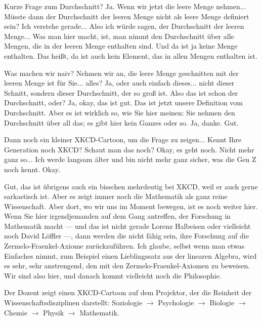 \begin{spoken-clean}[00:39:35 - 00:40:53]
Kurze Frage zum Durchschnitt? Ja. Wenn wir jetzt die leere Menge nehmen... Müsste dann der Durchschnitt der leeren Menge nicht als leere Menge definiert sein? Ich verstehe gerade... Also ich würde sagen, der Durchschnitt der leeren Menge... Was man hier macht, ist, man nimmt den Durchschnitt über alle Mengen, die in der leeren Menge enthalten sind. Und da ist ja keine Menge enthalten. Das heißt, da ist auch kein Element, das in allen Mengen enthalten ist.

Was machen wir naiv? Nehmen wir an, die leere Menge geschnitten mit der leeren Menge ist für Sie... alles? Ja, oder auch einfach dieses... nicht dieser Schnitt, sondern dieser Durchschnitt, der so groß ist. Also das ist schon der Durchschnitt, oder? Ja, okay, das ist gut. Das ist jetzt unsere Definition vom Durchschnitt. Aber es ist wirklich so, wie Sie hier meinen: Sie nehmen den Durchschnitt über all das; es gibt hier kein Ganzes oder so. Ja, danke. Gut.
\end{spoken-clean}

\begin{spoken-clean}[00:40:53 - 00:41:07]
Dann noch ein kleiner XKCD-Cartoon, um die Frage zu zeigen... Kennt Ihre Generation noch XKCD? Schaut man das noch? Okay, es geht noch. Nicht mehr ganz so... Ich werde langsam älter und bin nicht mehr ganz sicher, was die Gen Z noch kennt. Okay.

Gut, das ist übrigens auch ein bisschen mehrdeutig bei XKCD, weil er auch gerne sarkastisch ist. Aber es zeigt immer noch die Mathematik als ganz reine Wissenschaft. Aber dort, wo wir uns im Moment bewegen, ist es noch weiter hier. Wenn Sie hier irgendjemanden auf dem Gang antreffen, der Forschung in Mathematik macht --- und das ist nicht gerade Lorenz Halbeisen oder vielleicht noch David Löffler ---, dann werden die nicht fähig sein, ihre Forschung auf die Zermelo-Fraenkel-Axiome zurückzuführen. Ich glaube, selbst wenn man etwas Einfaches nimmt, zum Beispiel einen Lieblingssatz aus der linearen Algebra, wird es sehr, sehr anstrengend, den mit den Zermelo-Fraenkel-Axiomen zu beweisen. Wir sind also hier, und danach kommt vielleicht noch die Philosophie.
\end{spoken-clean}

\begin{meta-note}
Der Dozent zeigt einen XKCD-Cartoon auf dem Projektor, der die Reinheit der Wissenschaftsdisziplinen darstellt: Soziologie $\to$ Psychologie $\to$ Biologie $\to$ Chemie $\to$ Physik $\to$ Mathematik.
\end{meta-note}

